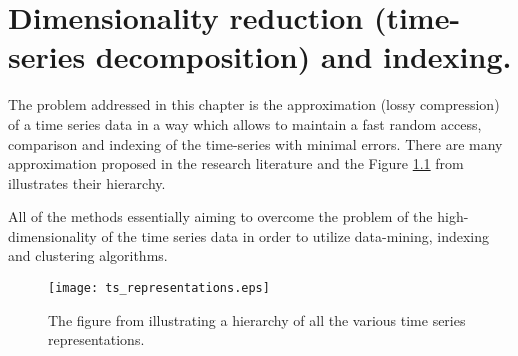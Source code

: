\chapter{Dimensionality reduction (time-series decomposition) and indexing.}
The problem addressed in this chapter is the approximation (lossy compression) of a time series data in a way which allows to maintain a fast random access, comparison and indexing of the time-series with minimal errors. There are many approximation proposed in the research literature and the Figure \ref{fig:approximations} from \cite{citeulike:2821475} illustrates their hierarchy.

All of the methods essentially aiming to overcome the problem of the high-dimensionality of the time series data in order to utilize data-mining, indexing and clustering algorithms. 


\begin{figure}[tbp]
   \centering
   \texttt{[image: ts\_representations.eps]}
   \caption{The figure from \cite{citeulike:2821475} illustrating a hierarchy of all the various time series representations.}
   \label{fig:approximations}
\end{figure} 
